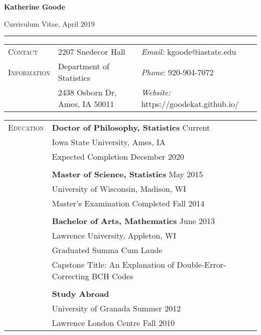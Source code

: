 \documentclass[11pt, oneside]{article}
\begin{document}
\begin{LARGE} \noindent\textbf{Katherine Goode} \end{LARGE} \hfill Curriculum Vitae, April 2019\\
\rule{\textwidth}{1pt}

\vspace{1cm}

\noindent 
\begin{tabular}{p{3cm}p{6.5cm}p{6.5cm}}
\textsc{Contact} & 2207 Snedecor Hall & \emph{Email:} kgoode@iastate.edu\\
\textsc{Information} & Department of Statistics & \emph{Phone}: 920-904-7072\\
& 2438 Osborn Dr, Ames, IA 50011 & \emph{Website:} https://goodekat.github.io/
\end{tabular}

\vspace{0.5cm}

\noindent 
\begin{tabular}{p{3cm}p{14cm}}
\textsc{Education} & \textbf{Doctor of Philosophy, Statistics} \hfill{Current}\\
& \indent Iowa State University, Ames, IA\\
& \indent Expected Completion December 2020\\
\\
& \textbf{Master of Science, Statistics} \hfill{May 2015}\\
& \indent University of Wisconsin, Madison, WI\\
& \indent Master's Examination Completed Fall 2014\\
\\
& \textbf{Bachelor of Arts, Mathematics} \hfill{June 2013}\\
& \indent Lawrence University, Appleton, WI\\
& \indent Graduated Summa Cum Laude\\
& \indent Capstone Title: An Explanation of Double-Error-Correcting BCH Codes\\
\\
& \textbf{Study Abroad}\\
& \indent University of Granada \hfill{Summer 2012}\\
& \indent Lawrence London Centre \hfill{Fall 2010}
\end{tabular}

\vspace{0.5cm}
\end{document}
